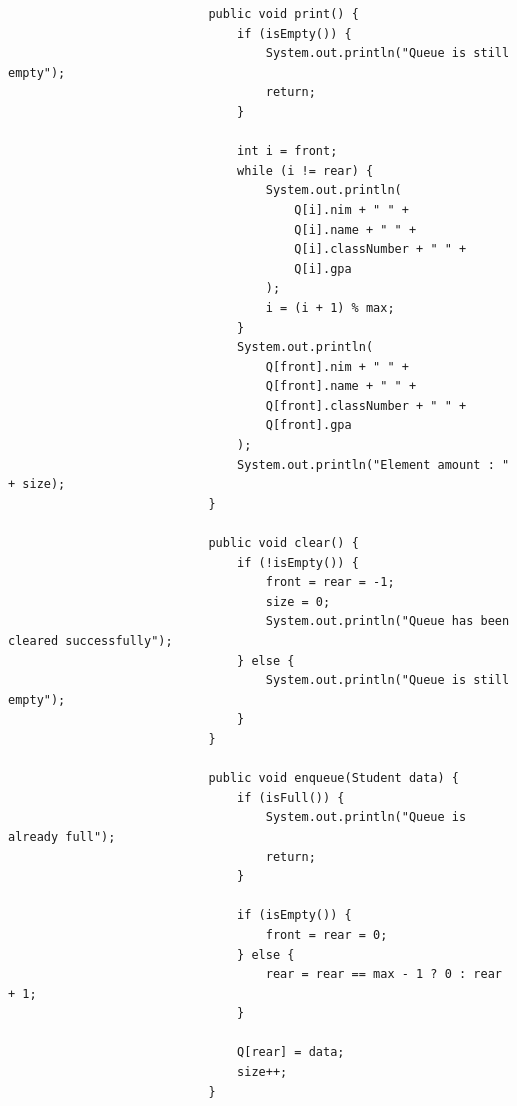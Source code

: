 \documentclass[12pt,titlepage]{article}
\begin{document}
\begin{enumerate}
{\begin{itemize}
\begin{itemize}
{\begin{verbatim}
                            public void print() {
                                if (isEmpty()) {
                                    System.out.println("Queue is still empty");
                                    return;
                                }

                                int i = front;
                                while (i != rear) {
                                    System.out.println(
                                        Q[i].nim + " " +
                                        Q[i].name + " " +
                                        Q[i].classNumber + " " + 
                                        Q[i].gpa
                                    );
                                    i = (i + 1) % max;
                                }
                                System.out.println(
                                    Q[front].nim + " " +
                                    Q[front].name + " " +
                                    Q[front].classNumber + " " +
                                    Q[front].gpa
                                );
                                System.out.println("Element amount : " + size);
                            }

                            public void clear() {
                                if (!isEmpty()) {
                                    front = rear = -1;
                                    size = 0;
                                    System.out.println("Queue has been cleared successfully");
                                } else {
                                    System.out.println("Queue is still empty");
                                }
                            }

                            public void enqueue(Student data) {
                                if (isFull()) {
                                    System.out.println("Queue is already full");
                                    return;
                                }

                                if (isEmpty()) {
                                    front = rear = 0;
                                } else {
                                    rear = rear == max - 1 ? 0 : rear + 1;
                                }

                                Q[rear] = data;
                                size++;
                            }


\end{verbatim}}
\end{itemize}
\end{itemize}}
\end{enumerate}
\end{document}
